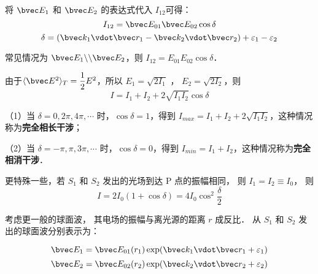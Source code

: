 将 $\bvec E_1$ 和 $ \bvec E_2$ 的表达式代入 $I_{12}$可得：
$$I_{12} = \bvec E_{01}\bvec E_{02} \cos\delta$$
$$\delta = (\bvec k_1 \vdot \bvec r_1 - \bvec k_2 \vdot \bvec r_2 ) + \varepsilon_1 - \varepsilon_2 $$

常见情况为 $\bvec E_1 \backslash\backslash\bvec E_2$，则 $ I_{12} = E_{01} E_{02}\cos\delta$．

由于$\langle \bvec E^2 \rangle _T = \dfrac{1}{2}E^2$，所以 $ E_1 = \sqrt{2I_1}$ ，  $ E_2 = \sqrt{2I_2}$，则
$$  I = I_1 + I_2 + 2\sqrt{I_1 I_2}\cos\delta$$

（1）当 $\delta = 0, 2\pi, 4\pi, \cdots$ 时，$\cos \delta = 1$，得到 $ I_{max} = I_1 + I_2 +2\sqrt{I_1 I_2}$，这种情况称为\textbf{完全相长干涉}；

（2）当 $\delta = -\pi, \pi, 3\pi, \cdots$ 时，$\cos \delta = 0$，得到 $ I_{min} = I_1 + I_2 $，这种情况称为\textbf{完全相消干涉}．

更特殊一些，若 $S_1$ 和 $S_2$ 发出的光场到达 P 点的振幅相同， 则 $ I_1 = I_2 \equiv I_0$， 则
$$ I = 2 I_0 ( 1 + \cos\delta ) = 4 I_0 \cos ^2\dfrac { \delta } { 2 } $$

考虑更一般的球面波， 其电场的振幅与离光源的距离 $ r $ 成反比． 从 $ S_1 $ 和 $ S_2 $ 发出的球面波分别表示为：

$$ \bvec E_1 = \bvec E_{ 01 } ( r_1 ) \exp( \bvec k_1 \vdot \bvec r_1 + \varepsilon_1 )$$
$$ \bvec E_2 = \bvec E_{ 02 } ( r_2 ) \exp( \bvec k_2 \vdot \bvec r_2 + \varepsilon_2 )$$



